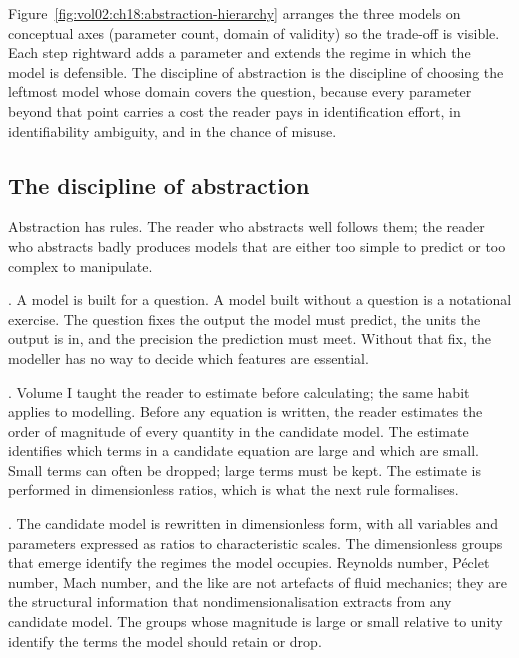 

Figure~\ref{fig:vol02:ch18:abstraction-hierarchy} arranges the three
models on conceptual axes (parameter count, domain of validity) so
the trade-off is visible. Each step rightward adds a parameter and
extends the regime in which the model is defensible. The discipline
of abstraction is the discipline of choosing the leftmost model
whose domain covers the question, because every parameter beyond
that point carries a cost the reader pays in identification effort,
in identifiability ambiguity, and in the chance of misuse.

\subsection{The discipline of abstraction}

Abstraction has rules. The reader who abstracts well follows them;
the reader who abstracts badly produces models that are either too
simple to predict or too complex to manipulate.

. A model is built for a
question. A model built without a question is a notational exercise.
The question fixes the output the model must predict, the units the
output is in, and the precision the prediction must meet. Without
that fix, the modeller has no way to decide which features are
essential.

. Volume I taught the
reader to estimate before calculating; the same habit applies to
modelling. Before any equation is written, the reader estimates the
order of magnitude of every quantity in the candidate model. The
estimate identifies which terms in a candidate equation are large
and which are small. Small terms can often be dropped; large terms
must be kept. The estimate is performed in dimensionless ratios,
which is what the next rule formalises.

. The candidate model is
rewritten in dimensionless form, with all variables and parameters
expressed as ratios to characteristic scales. The dimensionless
groups that emerge identify the regimes the model occupies. Reynolds
number, P{\'e}clet number, Mach number, and the like are not
artefacts of fluid mechanics; they are the structural information
that nondimensionalisation extracts from any candidate model. The
groups whose magnitude is large or small relative to unity identify
the terms the model should retain or drop.

